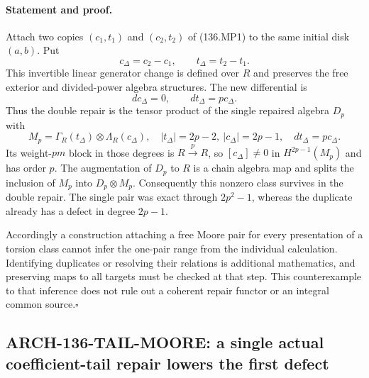 \paragraph{Statement and proof.}
Attach two copies $(c_1,t_1)$ and $(c_2,t_2)$ of (136.MP1) to the
same initial disk $(a,b)$.  Put
\[
                  c_\Delta=c_2-c_1,\qquad
                  t_\Delta=t_2-t_1.
\]
This invertible linear generator change is defined over $R$ and
preserves the free exterior and divided-power algebra structures.
The new differential is
\[
 dc_\Delta=0,\qquad dt_\Delta=p c_\Delta.
\]
Thus the double repair is the tensor product of the single repaired
algebra $D_p$ with
\[
 M_p=\Gamma_R(t_\Delta)\otimes\Lambda_R(c_\Delta),
       \quad |t_\Delta|=2p-2,\ |c_\Delta|=2p-1,
       \quad dt_\Delta=p c_\Delta.                       \tag{136.MD1}
\]
Its weight-$pm$ block in those degrees is $R\xrightarrow p R$,
so $[c_\Delta]\ne0$ in $H^{2p-1}(M_p)$ and has order $p$.
The augmentation of $D_p$ to $R$ is a chain algebra map and
splits the inclusion of $M_p$ into $D_p\otimes M_p$.
Consequently this nonzero class survives in the double repair.
The single pair was exact through $2p^2-1$, whereas the duplicate
already has a defect in degree $2p-1$.

Accordingly a construction attaching a free Moore pair for every
presentation of a torsion class cannot infer the one-pair range
from the individual calculation.  Identifying duplicates or
resolving their relations is additional mathematics, and preserving
maps to all targets must be checked at that step.  This counterexample
to that inference does not rule out a coherent repair functor or an
integral common source.\hfill$\square$

\subsection{ARCH-136-TAIL-MOORE: a single actual coefficient-tail repair lowers the first defect}

